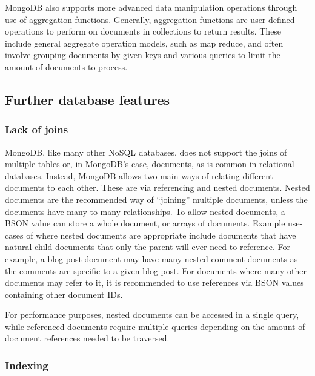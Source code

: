\documentclass[a4paper,11pt]{article}
\begin{document}
MongoDB also supports more advanced data manipulation operations through use of aggregation functions. Generally, aggregation
functions are user defined operations to perform on documents in collections to return results. These include general
aggregate operation models, such as map reduce, and often involve grouping documents by given keys and various queries
to limit the amount of documents to process.



\subsection{Further database features} %
\label{sub:further_database_features}

\subsubsection{Lack of joins} %
\label{ssub:joins}

MongoDB, like many other NoSQL databases, does not support the joins of multiple tables or, in MongoDB's case, documents,
as is common in relational databases.
Instead, MongoDB allows two main ways of relating different documents to each other. These are via referencing and
nested documents. Nested documents are the recommended way of ``joining'' multiple documents, unless the documents have
many-to-many relationships. To allow nested documents, a BSON value can store a whole document, or arrays of documents.
Example use-cases of where nested documents are appropriate include documents that have natural child documents that
only the parent will ever need to reference. For example, a blog post document may have many nested comment documents as the
comments are specific to a given blog post. For documents where many other documents may refer to it, it is recommended to use
references via BSON values containing other document IDs.

For performance purposes, nested documents can be accessed in a single query, while referenced documents require multiple
queries depending on the amount of document references needed to be traversed.



\subsubsection{Indexing} %
\label{ssub:indexing}
\end{document}

